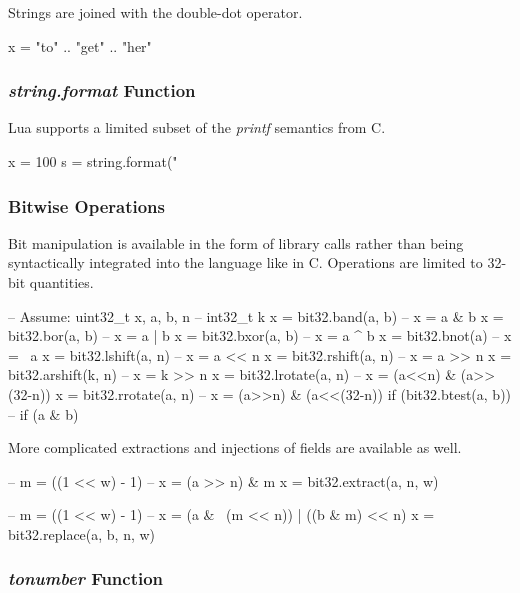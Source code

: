 \documentclass[11pt]{article}
\newcommand{\func}[1]{\mbox{\itshape#1}}
\begin{document}
Strings are joined with the double-dot operator.

\begin{LuaCode}
x = "to" .. "get" .. "her"
\end{LuaCode}

\subsubsection{\func{string.format} Function}

Lua supports a limited subset of the \func{printf} semantics from C.

\begin{LuaCode}
x = 100
s = string.format("%
\end{LuaCode}

\subsubsection{Bitwise Operations}

Bit manipulation is available in the form of library calls rather than being
syntactically  integrated into the language like in C.  Operations are limited
to 32-bit quantities.

\begin{LuaCode}
-- Assume: uint32_t x, a, b, n
--         int32_t k
x = bit32.band(a, b)    -- x = a & b
x = bit32.bor(a, b)     -- x = a | b
x = bit32.bxor(a, b)    -- x = a ^ b
x = bit32.bnot(a)       -- x = ~a
x = bit32.lshift(a, n)  -- x = a << n
x = bit32.rshift(a, n)  -- x = a >> n
x = bit32.arshift(k, n) -- x = k >> n
x = bit32.lrotate(a, n) -- x = (a<<n) & (a>>(32-n))
x = bit32.rrotate(a, n) -- x = (a>>n) & (a<<(32-n))
if (bit32.btest(a, b))  -- if (a & b)
\end{LuaCode}

More complicated extractions and injections of fields are available as well.

\begin{LuaCode}
-- m = ((1 << w) - 1)
-- x = (a >> n) & m
x = bit32.extract(a, n, w)
\end{LuaCode}

\begin{LuaCode}
-- m = ((1 << w) - 1)
-- x = (a & ~(m << n)) | ((b & m) << n)
x = bit32.replace(a, b, n, w)
\end{LuaCode}

\subsubsection{\func{tonumber} Function}
\end{document}
